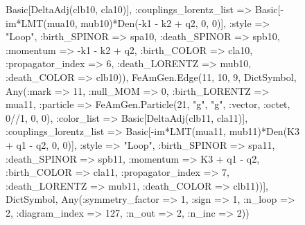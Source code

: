 \documentclass{revtex4}
\begin{document}
\begin{figure}[!htb]
\begin{center}
{Basic[DeltaAdj(clb10, cla10)], :couplings_lorentz_list => Basic[-im*LMT(mua10, mub10)*Den(-k1 - k2 + q2, 0, 0)], :style => "Loop", :birth_SPINOR => spa10, :death_SPINOR => spb10, :momentum => -k1 - k2 + q2, :birth_COLOR => cla10, :propagator_index => 6, :death_LORENTZ => mub10, :death_COLOR => clb10)), FeAmGen.Edge(11, 10, 9, Dict{Symbol, Any}(:mark => 11, :null_MOM => 0, :birth_LORENTZ => mua11, :particle => FeAmGen.Particle(21, "g", "g", :vector, :octet, 0//1, 0, 0), :color_list => Basic[DeltaAdj(clb11, cla11)], :couplings_lorentz_list => Basic[-im*LMT(mua11, mub11)*Den(K3 + q1 - q2, 0, 0)], :style => "Loop", :birth_SPINOR => spa11, :death_SPINOR => spb11, :momentum => K3 + q1 - q2, :birth_COLOR => cla11, :propagator_index => 7, :death_LORENTZ => mub11, :death_COLOR => clb11))], Dict{Symbol, Any}(:symmetry_factor => 1, :sign => 1, :n_loop => 2, :diagram_index => 127, :n_out => 2, :n_inc => 2)) 
}
\end{center}
\end{figure}
\end{document}
